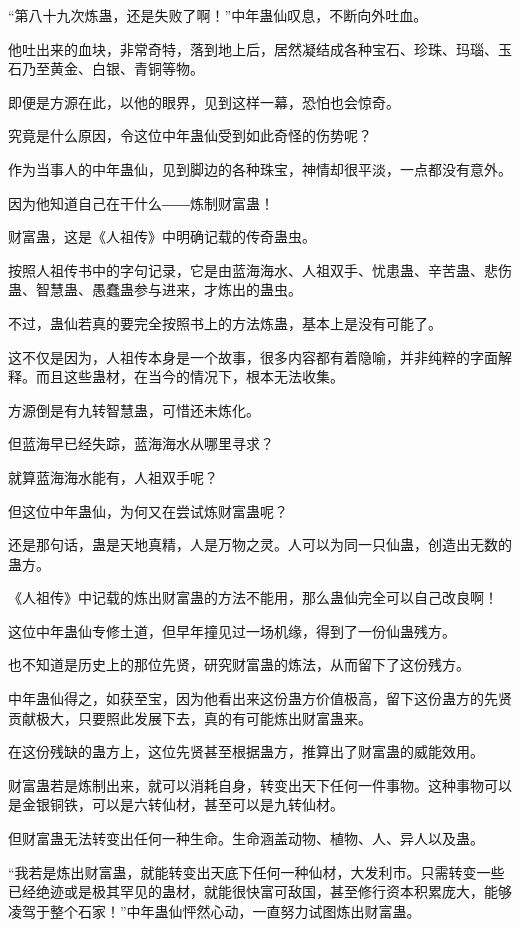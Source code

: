 \begin{this_body}
“第八十九次炼蛊，还是失败了啊！”中年蛊仙叹息，不断向外吐血。

他吐出来的血块，非常奇特，落到地上后，居然凝结成各种宝石、珍珠、玛瑙、玉石乃至黄金、白银、青铜等物。

即便是方源在此，以他的眼界，见到这样一幕，恐怕也会惊奇。

究竟是什么原因，令这位中年蛊仙受到如此奇怪的伤势呢？

作为当事人的中年蛊仙，见到脚边的各种珠宝，神情却很平淡，一点都没有意外。

因为他知道自己在干什么――炼制财富蛊！

财富蛊，这是《人祖传》中明确记载的传奇蛊虫。

按照人祖传书中的字句记录，它是由蓝海海水、人祖双手、忧患蛊、辛苦蛊、悲伤蛊、智慧蛊、愚蠢蛊参与进来，才炼出的蛊虫。

不过，蛊仙若真的要完全按照书上的方法炼蛊，基本上是没有可能了。

这不仅是因为，人祖传本身是一个故事，很多内容都有着隐喻，并非纯粹的字面解释。而且这些蛊材，在当今的情况下，根本无法收集。

方源倒是有九转智慧蛊，可惜还未炼化。

但蓝海早已经失踪，蓝海海水从哪里寻求？

就算蓝海海水能有，人祖双手呢？

但这位中年蛊仙，为何又在尝试炼财富蛊呢？

还是那句话，蛊是天地真精，人是万物之灵。人可以为同一只仙蛊，创造出无数的蛊方。

《人祖传》中记载的炼出财富蛊的方法不能用，那么蛊仙完全可以自己改良啊！

这位中年蛊仙专修土道，但早年撞见过一场机缘，得到了一份仙蛊残方。

也不知道是历史上的那位先贤，研究财富蛊的炼法，从而留下了这份残方。

中年蛊仙得之，如获至宝，因为他看出来这份蛊方价值极高，留下这份蛊方的先贤贡献极大，只要照此发展下去，真的有可能炼出财富蛊来。

在这份残缺的蛊方上，这位先贤甚至根据蛊方，推算出了财富蛊的威能效用。

财富蛊若是炼制出来，就可以消耗自身，转变出天下任何一件事物。这种事物可以是金银铜铁，可以是六转仙材，甚至可以是九转仙材。

但财富蛊无法转变出任何一种生命。生命涵盖动物、植物、人、异人以及蛊。

“我若是炼出财富蛊，就能转变出天底下任何一种仙材，大发利市。只需转变一些已经绝迹或是极其罕见的蛊材，就能很快富可敌国，甚至修行资本积累庞大，能够凌驾于整个石家！”中年蛊仙怦然心动，一直努力试图炼出财富蛊。


\end{this_body}
